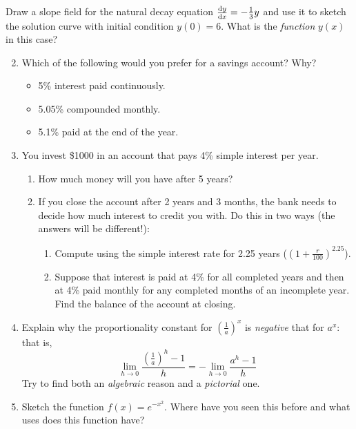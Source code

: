 \begin{exercises}{}{}
	\exstart Draw a slope field for the natural decay equation $\diff[y]{x}=-\frac 13y$ and use it to sketch the solution curve with initial condition $y(0)=6$. What is the \emph{function} $y(x)$ in this case?
	
	\begin{enumerate}\setcounter{enumi}{1}
	  \item Which of the following would you prefer for a savings account? Why?
		\begin{itemize}
	  	\item 5\% interest paid continuously. %
	  	\item 5.05\% compounded monthly. %
	  	\item 5.1\% paid at the end of the year. 
		\end{itemize}
		
	   
	  \item You invest \$1000 in an account that pays 4\% simple interest per year.
	  \begin{enumerate}
	    \item How much money will you have after 5 years?
	    \item If you close the account after 2 years and 3 months, the bank needs to decide how much interest to credit you with. Do this in two ways (the answers will be different!):
	    \begin{enumerate}
	      \item Compute using the simple interest rate for 2.25 years ($(1+\frac r{100})^{2.25}$).
	      \item Suppose that interest is paid at 4\% for all completed years and then at 4\% paid monthly for any completed months of an incomplete year. Find the balance of the account at closing.
	    \end{enumerate}
		\end{enumerate}

	
	  \item Explain why the proportionality constant for $\left(\frac 1a\right)^x$ is \emph{negative} that for $a^x$: that is,
	  \[
	  	\lim_{h\to 0}\frac{(\frac 1a)^h-1}h=-\lim_{h\to 0}\frac{a^h-1}h
	  \]
	  Try to find both an \emph{algebraic} reason and a \emph{pictorial} one.
	  
	  
	  \item Sketch the function $f(x)=e^{-x^2}$. Where have you seen this before and what uses does this function have?
	\end{enumerate}

\end{exercises}


